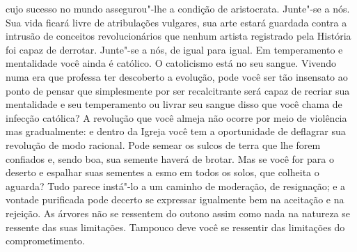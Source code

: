cujo sucesso no mundo assegurou"-lhe a condição de aristocrata. 
Junte"-se a nós.  Sua vida ficará livre de atribulações vulgares, sua
arte estará \label{guardada"-contra} guardada contra a intrusão de conceitos revolucionários
que nenhum artista registrado pela História foi capaz de derrotar. 
Junte"-se a nós, de igual para igual.  Em temperamento e mentalidade
você ainda é católico.  O catolicismo está no seu sangue.  Vivendo
numa era que professa ter descoberto a evolução, pode você ser tão
insensato ao ponto de pensar que simplesmente por ser recalcitrante
será capaz de recriar sua mentalidade e seu temperamento ou livrar seu
sangue disso que você chama de infecção católica?  A revolução que você
almeja não ocorre por meio de violência mas gradualmente: e dentro da
Igreja você tem a oportunidade de deflagrar sua revolução de modo
racional.  Pode semear os sulcos de terra que lhe forem confiados e,
sendo boa, sua semente haverá de brotar.  Mas se você for para o
deserto e espalhar suas sementes a esmo em todos os solos, que colheita
o aguarda?  Tudo parece instá"-lo a um caminho de moderação, de
resignação; e a vontade purificada pode decerto se expressar igualmente
bem na aceitação e na rejeição.  As árvores não se ressentem do outono
assim como nada na natureza se ressente das suas limitações. 
Tampouco deve você se ressentir das limitações do comprometimento.

